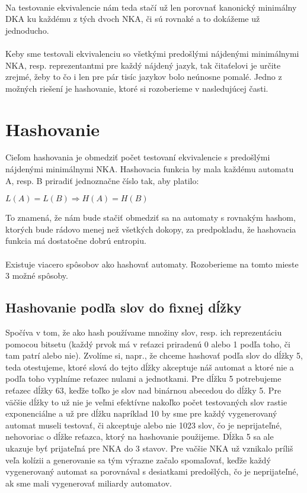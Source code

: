 \paragraph{}
Na testovanie ekvivalencie nám teda stačí už len porovnať kanonický minimálny DKA ku každému z tých dvoch NKA, či sú rovnaké a to dokážeme už jednoducho.

\paragraph{}
Keby sme testovali ekvivalenciu so všetkými predošlými nájdenými minimálnymi NKA, resp. reprezentantmi pre každý nájdený jazyk, tak čitaťelovi je určite zrejmé, žeby to čo i len pre pár tisíc jazykov bolo neúnosne pomalé. Jedno z možných riešení je hashovanie, ktoré si rozoberieme v nasledujúcej časti.


\section{Hashovanie}
Cieľom hashovania je obmedziť počet testovaní ekvivalencie s predošlými nájdenými minimálnymi NKA. Hashovacia funkcia by mala každému automatu A, resp. B priradiť jednoznačne číslo tak, aby platilo:
\\
\centerline{$L(A) = L(B) \Rightarrow H(A) = H(B)$}
To znamená, že nám bude stačiť obmedziť sa na automaty s rovnakým hashom, ktorých bude rádovo menej než všetkých dokopy, za predpokladu, že hashovacia funkcia má dostatočne dobrú entropiu.

\paragraph{}
Existuje viacero spôsobov ako hashovať automaty. Rozoberieme na tomto mieste 3 možné spôsoby.


\label{hashSlova}
\subsection{Hashovanie podľa slov do fixnej dĺžky}
Spočíva v tom, že ako hash používame množiny slov, resp. ich reprezentáciu pomocou bitsetu (každý prvok má v reťazci priradenú 0 alebo 1 podľa toho, či tam patrí alebo nie). Zvolíme si, napr., že chceme hashovať podľa slov do dĺžky 5, teda otestujeme, ktoré slová do tejto dĺžky akceptuje náš automat a ktoré nie a podľa toho vyplníme reťazec nulami a jednotkami. Pre dĺžku 5 potrebujeme reťazec dĺžky 63, keďže toľko je slov nad binárnou abecedou do dĺžky 5. Pre väčšie dĺžky to už nie je veľmi efektívne nakoľko počet testovaných slov rastie exponenciálne a už pre dĺžku napríklad 10 by sme pre každý vygenerovaný automat museli testovať, či akceptuje alebo nie 1023 slov, čo je neprijateľné, nehovoriac o dĺžke reťazca, ktorý na hashovanie použijeme. Dĺžka 5 sa ale ukazuje byť prijateľná pre NKA do 3 stavov. Pre vačšie NKA už vznikalo príliš veľa kolízii a generovanie sa tým výrazne začalo spomaľovať, keďže každý vygenerovaný automat sa porovnával s desiatkami predošlých, čo je neprijateľné, ak sme mali vygenerovať miliardy automatov.


